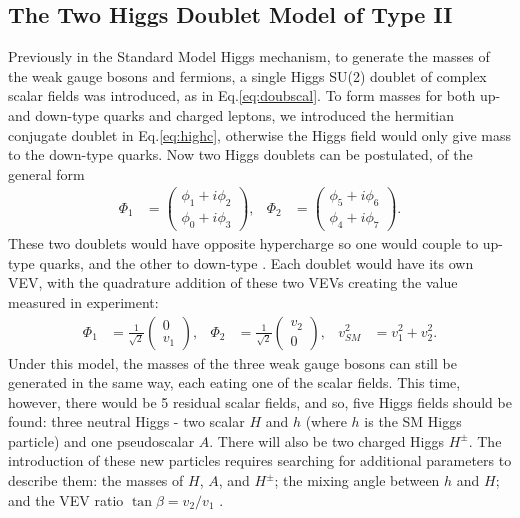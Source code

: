 \documentclass[a4paper,12pt]{article}
\begin{document}
\subsection{The Two Higgs Doublet Model of Type II}
\label{subsec:2hdm}
Previously in the Standard Model Higgs mechanism, to generate the masses of the weak gauge bosons and fermions, a single Higgs SU(2) doublet of complex scalar fields was introduced, as in Eq.\eqref{eq:doubscal}.
To form masses for both up- and down-type quarks and charged leptons, we introduced the hermitian conjugate doublet in Eq.\eqref{eq:highc}, otherwise the Higgs field would only give mass to the down-type quarks. 
Now two Higgs doublets can be postulated, of the general form
\begin{align}
    \label{eq:gdbl}
    \Phi_1 &= \begin{pmatrix} \phi_1 + i\phi_2 \\ \phi_0 + i\phi_3\end{pmatrix}, & \Phi_2 &= \begin{pmatrix} \phi_5+i\phi_6\\\phi_4+i\phi_7\end{pmatrix}.
\end{align}
These two doublets would have opposite hypercharge so one would couple to up-type quarks, and the other to down-type \cite{s}. 
Each doublet would have its own VEV, with the quadrature addition of these two VEVs creating the value measured in experiment:
\begin{align}
    \label{eq:dbldbl}
    \Phi_1 &= \frac{1}{\sqrt{2}}\begin{pmatrix}0\\v_1\end{pmatrix}, & \Phi_2 &= \frac{1}{\sqrt{2}}\begin{pmatrix}v_2\\0\end{pmatrix}, & v_{SM}^2 &= v_1^2 + v_2^2.
\end{align}
Under this model, the masses of the three weak gauge bosons can still be generated in the same way, each eating one of the scalar fields. 
This time, however, there would be 5 residual scalar fields, and so, five Higgs fields should be found: three neutral Higgs - two scalar $H$ and $h$ (where $h$ is the SM Higgs particle) and one pseudoscalar $A$.
There will also be two charged Higgs $H^\pm$.
The introduction of these new particles requires searching for additional parameters to describe them: the masses of $H$, $A$, and $H^\pm$; the mixing angle between $h$ and $H$; and the VEV ratio $\tan\beta=v_2/v_1$ \cite{a}.
\end{document}
